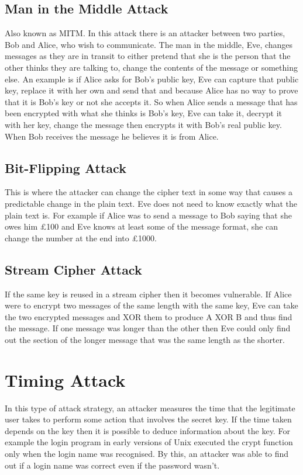\subsection{Man in the Middle Attack}
Also known as MITM. In this attack there is an attacker between two parties, Bob and Alice, who wish to communicate. The man in the middle, Eve, changes messages as they are in transit to either pretend that she is the person that the other thinks they are talking to, change the contents of the message or something else. An example is if Alice asks for Bob's public key, Eve can capture that public key, replace it with her own and send that and because Alice has no way to prove that it is Bob's key or not she accepts it. So when Alice sends a message that has been encrypted with what she thinks is Bob's key, Eve can take it, decrypt it with her key, change the message then encrypts it with Bob's real public key. When Bob receives the message he believes it is from Alice.

\subsection{Bit-Flipping Attack}
This is where the attacker can change the cipher text in some way that causes a predictable change in the plain text. Eve does not need to know exactly what the plain text is. For example if Alice was to send a message to Bob saying that she owes him £100 and Eve knows at least some of the message format, she can change the number at the end into £1000. 

\subsection{Stream Cipher Attack}
If the same key is reused in a stream cipher then it becomes vulnerable. If Alice were to encrypt two messages of the same length with the same key, Eve can take the two encrypted messages and XOR them to produce A XOR B and thus find the message. If one message was longer than the other then Eve could only find out the section of the longer message that was the same length as the shorter.

\section{Timing Attack}
In this type of attack strategy, an attacker measures the time that the legitimate user takes to perform some action that involves the secret key. If the time taken depends on the key then it is possible to deduce information about the key. For example the login program in early versions of Unix executed the crypt function only when the login name was recognised. By this, an attacker was able to find out if a login name was correct even if the password wasn't.

